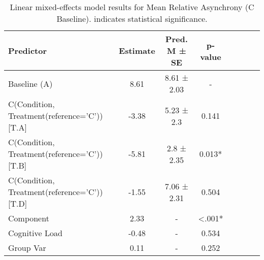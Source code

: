 
    \begin{table}[H]
    \centering
    \begin{small}
    \begin{tabular}{lccccccc}
\toprule
Predictor & Estimate & Pred. M ± SE & p-value \\
\midrule
Baseline (A) & 8.61 & 8.61 ± 2.03 & - \\
C(Condition, Treatment(reference='C'))[T.A] & -3.38 & 5.23 ± 2.3 & 0.141 \\
C(Condition, Treatment(reference='C'))[T.B] & -5.81 & 2.8 ± 2.35 & 0.013* \\
C(Condition, Treatment(reference='C'))[T.D] & -1.55 & 7.06 ± 2.31 & 0.504 \\
Component & 2.33 & - & <.001* \\
Cognitive Load & -0.48 & - & 0.534 \\
Group Var & 0.11 & - & 0.252 \\
\bottomrule
\end{tabular}

    \end{small}
    \caption[Linear mixed-effects model results for Mean Relative Asynchrony (C Baseline)]{Linear mixed-effects model results for Mean Relative Asynchrony (C Baseline). \newline * indicates statistical significance.}
    \label{tab:meanrelativeasynchrony (c baseline)}

    \end{table}